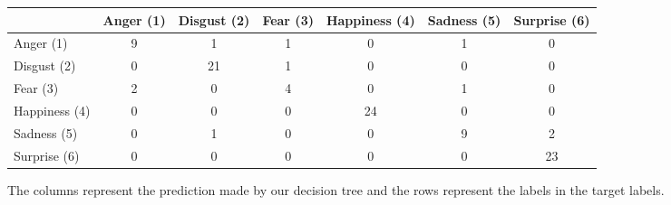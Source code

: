 \begin{figure}[h]
    \begin{tabular}{ | l || c | c | c | c | c | c | }
    \hline
          & Anger (1) & Disgust (2) & Fear (3) & Happiness (4) & Sadness (5) & Surprise (6) \\ \hline \hline
        Anger (1) & 9 & 1 & 1 & 0 & 1 & 0 \\ \hline
        Disgust (2) & 0 & 21 & 1 & 0 & 0 & 0 \\ \hline
        Fear (3) & 2 & 0 & 4 & 0 & 1 & 0 \\ \hline
        Happiness (4) & 0 & 0 & 0 & 24 & 0 & 0 \\ \hline
        Sadness (5) & 0 & 1 & 0 & 0 & 9 & 2 \\ \hline
        Surprise (6) & 0 & 0 & 0 & 0 & 0 & 23 \\ \hline
    \end{tabular}
    \caption{The columns represent the prediction made by our decision tree and
    the rows represent the labels in the target labels.}
    \label{fig:confusionMatrix}
\end{figure}
